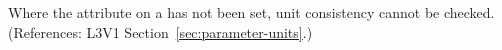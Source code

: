 Where the  attribute on a \Parameter has 
not been set, unit consistency cannot be checked.  (References: 
L3V1 Section~\ref{sec:parameter-units}.)
